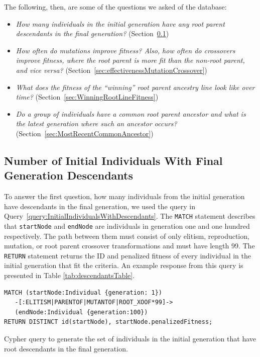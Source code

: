 \documentclass[12pt]{article}
\begin{document}
The following, then, are some of the questions we asked of the database:
\begin{itemize}
\item \emph{How many individuals in the initial generation have any root parent descendants in the final generation?} (Section~\ref{sec:numberInitialIndividualsWithDescendants})
\item \emph{How often do mutations improve fitness? Also, how often do crossovers improve fitness, where the root parent is more fit than the non-root parent, and vice versa?} (Section~\ref{sec:effectivenessMutationCrossover})
\item \emph{What does the fitness of the ``winning'' root parent ancestry line look like over time?} (Section~\ref{sec:WinningRootLineFitness})
\item \emph{Do a group of individuals have a common root parent ancestor and what is the latest generation where such an ancestor occurs?} (Section~\ref{sec:MostRecentCommonAncestor})
\end{itemize}

\subsection{Number of Initial Individuals With Final Generation Descendants}
\label{sec:numberInitialIndividualsWithDescendants}

To answer the first question, how many individuals from the initial generation have descendants in the final generation, we used the query in Query~\ref{query:InitialIndividualsWithDescendants}. The \texttt{MATCH} statement describes that \texttt{startNode} and \texttt{endNode} are individuals in generation one and one hundred respectively. The path between them must consist of only elitism, reproduction, mutation, or root parent crossover transformations and must have length 99. The \texttt{RETURN} statement returns the ID and penalized fitness of every individual in the initial generation that fit the criteria. An example response from this query is presented in Table \ref{tab:descendantsTable}.

\begin{Query}
\begin{verbatim}
MATCH (startNode:Individual {generation: 1})
   -[:ELITISM|PARENTOF|MUTANTOF|ROOT_XOOF*99]->
   (endNode:Individual {generation:100})
RETURN DISTINCT id(startNode), startNode.penalizedFitness;
\end{verbatim}
\caption{Cypher query to generate the set of individuals in the initial generation that have root descendants in the final generation.}
\label{query:InitialIndividualsWithDescendants}
\end{Query}
\end{document}
